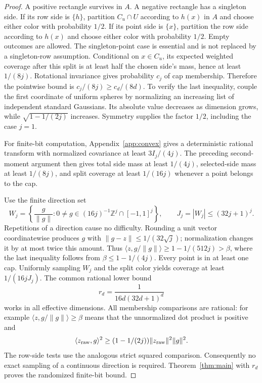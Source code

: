 \begin{proof}
A positive rectangle survives in $A$. A negative rectangle has a singleton side. If its row side is $\{h\}$, partition $C_u\cap U$ according to $h(x)$ in $A$ and choose either color with probability $1/2$. If its point side is $\{x\}$, partition the row side according to $h(x)$ and choose either color with probability $1/2$. Empty outcomes are allowed. The singleton-point case is essential and is not replaced by a singleton-row assumption. Conditional on $x\in C_u$, its expected weighted coverage after this split is at least half the chosen side's mass, hence at least $1/(8j)$. Rotational invariance gives probability $c_j$ of cap membership. Therefore the pointwise bound is $c_j/(8j)\ge c_d/(8d)$. To verify the last inequality, couple the first coordinate of uniform spheres by normalizing an increasing list of independent standard Gaussians. Its absolute value decreases as dimension grows, while $\sqrt{1-1/(2j)}$ increases. Symmetry supplies the factor $1/2$, including the case $j=1$.

For finite-bit computation, Appendix~\ref{app:convex} gives a deterministic rational transform with normalized covariance at least $3I_j/(4j)$. The preceding second-moment argument then gives total side mass at least $1/(4j)$, selected-side mass at least $1/(8j)$, and split coverage at least $1/(16j)$ whenever a point belongs to the cap.

Use the finite direction set
\[
 W_j=\left\{\frac{g}{\|g\|}:0\ne g\in(16j)^{-1}\mathbb Z^j\cap[-1,1]^j\right\},
 \qquad J_j=|W_j|\le(32j+1)^j.
\]
Repetitions of a direction cause no difficulty. Rounding a unit vector coordinatewise produces $g$ with $\|g-z\|\le1/(32\sqrt j)$; normalization changes it by at most twice this amount. Thus $\langle z,g/\|g\|\rangle\ge1-1/(512j)>\beta$, where the last inequality follows from $\beta\le1-1/(4j)$. Every point is in at least one cap. Uniformly sampling $W_j$ and the split color yields coverage at least $1/(16jJ_j)$. The common rational lower bound
\begin{equation}\label{eq:netr}
 r_d=\frac1{16d(32d+1)^d}
\end{equation}
works in all effective dimensions. All membership comparisons are rational: for example $\langle z,g/\|g\|\rangle\ge\beta$ means that the unnormalized dot product is positive and
\[
 \langle z_{\rm raw},g\rangle^2\ge(1-1/(2j))\|z_{\rm raw}\|^2\|g\|^2.
\] The row-side tests use the analogous strict squared comparison. Consequently no exact sampling of a continuous direction is required. Theorem~\ref{thm:main} with $r_d$ proves the randomized finite-bit bound.


\end{proof}
